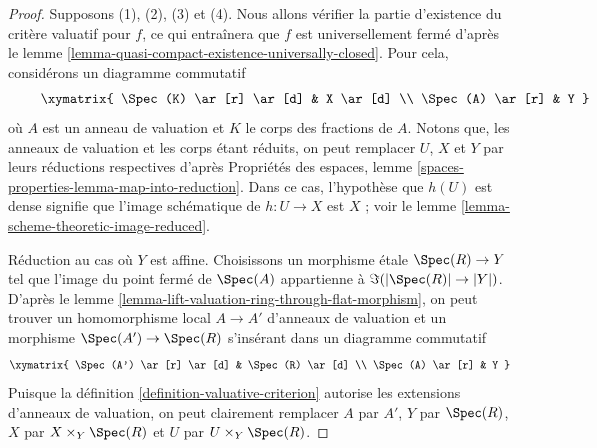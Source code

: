 \begin{proof}
Supposons (1), (2), (3) et (4).
Nous allons vérifier la partie d'existence du critère valuatif pour $f$,
ce qui entraînera que $f$ est universellement fermé d'après le
lemme \ref{lemma-quasi-compact-existence-universally-closed}.
Pour cela, considérons un diagramme commutatif
\begin{equation}
\label{equation-start-with}
\vcenter{
\xymatrix{
\Spec(K) \ar[r] \ar[d] & X \ar[d] \\
\Spec(A) \ar[r] & Y
}
}
\end{equation}
où $A$ est un anneau de valuation et $K$ le corps des fractions de $A$.
Notons que, les anneaux de valuation et les corps étant réduits, on peut
remplacer $U$, $X$ et $Y$ par leurs réductions respectives d'après
Propriétés des espaces, lemme \ref{spaces-properties-lemma-map-into-reduction}.
Dans ce cas, l'hypothèse que $h(U)$ est dense signifie que
l'image schématique de $h : U \to X$ est $X$ ; voir le
lemme \ref{lemma-scheme-theoretic-image-reduced}.

\medskip\noindent
Réduction au cas où $Y$ est affine. Choisissons un morphisme étale
$\Spec(R) \to Y$ tel que l'image du point fermé de $\Spec(A)$
appartienne à $\Im(|\Spec(R)| \to |Y|)$. D'après le
lemme \ref{lemma-lift-valuation-ring-through-flat-morphism},
on peut trouver un homomorphisme local $A \to A'$ d'anneaux de valuation
et un morphisme $\Spec(A') \to \Spec(R)$ s'insérant dans un
diagramme commutatif
$$
\xymatrix{
\Spec(A') \ar[r] \ar[d] & \Spec(R) \ar[d] \\
\Spec(A) \ar[r] & Y
}
$$
Puisque la définition \ref{definition-valuative-criterion}
autorise les extensions d'anneaux de valuation,
on peut clairement remplacer $A$ par $A'$, $Y$ par $\Spec(R)$,
$X$ par $X \times_Y \Spec(R)$ et $U$ par $U \times_Y \Spec(R)$.


\end{proof}
